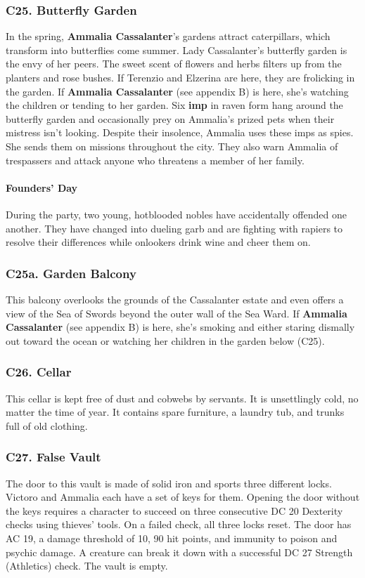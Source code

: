 \documentclass[10pt,a4paper,twoside,twocolumn,openany,nodeprecatedcode]{dndbook}
\begin{document}
\subsubsection{C25. Butterfly Garden}
In the spring, \textbf{Ammalia Cassalanter}'s gardens attract caterpillars, which transform into butterflies come summer. Lady Cassalanter's butterfly garden is the envy of her peers. The sweet scent of flowers and herbs filters up from the planters and rose bushes.
If Terenzio and Elzerina are here, they are frolicking in the garden. If \textbf{Ammalia Cassalanter} (see appendix B) is here, she's watching the children or tending to her garden. Six \textbf{imp} in raven form hang around the butterfly garden and occasionally prey on Ammalia's prized pets when their mistress isn't looking. Despite their insolence, Ammalia uses these imps as spies. She sends them on missions throughout the city. They also warn Ammalia of trespassers and attack anyone who threatens a member of her family.
\paragraph{Founders' Day}
During the party, two young, hotblooded nobles have accidentally offended one another. They have changed into dueling garb and are fighting with rapiers to resolve their differences while onlookers drink wine and cheer them on.
\subsubsection{C25a. Garden Balcony}
This balcony overlooks the grounds of the Cassalanter estate and even offers a view of the Sea of Swords beyond the outer wall of the Sea Ward.
If \textbf{Ammalia Cassalanter} (see appendix B) is here, she's smoking and either staring dismally out toward the ocean or watching her children in the garden below (C25).
\subsubsection{C26. Cellar}
This cellar is kept free of dust and cobwebs by servants. It is unsettlingly cold, no matter the time of year. It contains spare furniture, a laundry tub, and trunks full of old clothing.
\subsubsection{C27. False Vault}
The door to this vault is made of solid iron and sports three different locks. Victoro and Ammalia each have a set of keys for them. Opening the door without the keys requires a character to succeed on three consecutive DC 20 Dexterity checks using thieves' tools. On a failed check, all three locks reset. The door has AC 19, a damage threshold of 10, 90 hit points, and immunity to poison and psychic damage. A creature can break it down with a successful DC 27 Strength (Athletics) check.
The vault is empty.
\end{document}
